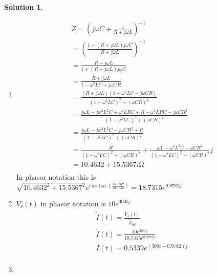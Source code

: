 \documentclass[10pt]{article}
\theoremstyle{definition}
\newtheorem{soln}{Solution}
\newcommand{\ti}[1]{\widetilde{#1}}
\begin{document}
\begin{soln}~
  \begin{enumerate}[label=(\alph*)]
    \item \begin{align*}
             & Z=\left(j\omega C+\frac{1}{R+j\omega L}\right)^{-1}                                                                    \\
             & =\left(\frac{1+\left(R+j\omega L\right)j\omega C}{R+j\omega L}\right)^{-1}                                             \\
             & =\frac{R+j\omega L}{1+\left(R+j\omega L\right)j\omega C}                                                               \\
             & =\frac{R+j\omega L}{1-\omega^2 LC+j\omega CR}                                                                          \\
             & =\frac{(R+j\omega L)(1-\omega^2 LC-j\omega CR)}{(1-\omega^2 LC)^2+(\omega CR)^2}                                       \\
             & =\frac{j\omega L-j\omega^3 L^2C+\omega^2 LRC + R-\omega^2 LRC-j\omega CR^2}{(1-\omega^2 LC)^2+(\omega CR)^2}           \\
             & =\frac{j\omega L-j\omega^3 L^2C-j\omega CR^2+ R}{(1-\omega^2 LC)^2+(\omega CR)^2}                                      \\
             & =\frac{R}{(1-\omega^2 LC)^2+(\omega CR)^2}+\frac{\omega L-\omega^3 L^2C-\omega CR^2}{(1-\omega^2 LC)^2+(\omega CR)^2}j \\
             & =10.4632+15.5367i\unit{\ohm}                                                                                           \\
          \end{align*}
          In phasor notation this is $\sqrt{10.4632^2+15.5367^2}e^{i\arctan\left(\frac{15.5367}{10.4632}\right)}=18.7315e^{0.9782j}$
    \item $V_s(t)$ in phasor notation is $10e^{300tj}$
          \begin{align*}
             & \ti{I}(t)=\frac{\ti{V}_s(t)}{\ti{Z}_{tot}}       \\
             & \ti{I}(t)=\frac{10e^{300tj}}{18.7315e^{0.9782j}} \\
             & \ti{I}(t)=0.5339e^{(300t-0.9782)j}               \\
          \end{align*}
    \item \begin{align*}

\end{align*}
\end{enumerate}
\end{soln}
\end{document}
